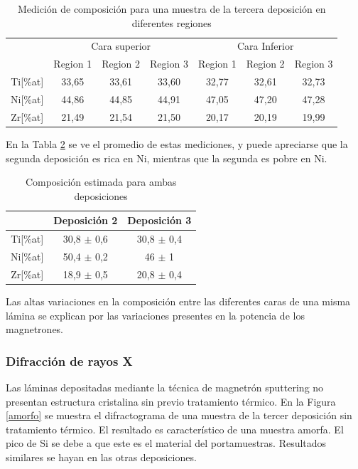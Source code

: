 \documentclass{article}
\theoremstyle{definition}
\theoremstyle{remark}
\begin{document}
\begin{table}[H]
\begin{tabular}{c|c|c|c|c|c|c|}
\cline{2-7}
\multicolumn{1}{l|}{} & \multicolumn{3}{c|}{Cara superior} & \multicolumn{3}{c|}{Cara Inferior} \\ \cline{2-7} 
\multicolumn{1}{l|}{} & Region 1 & Region 2 & Region 3 & Region 1 & Region 2 & Region 3 \\ \hline
\multicolumn{1}{|c|}{Ti{[}\%at{]}} & 33,65 & 33,61 & 33,60 & 32,77 & 32,61 & 32,73 \\ \hline
\multicolumn{1}{|c|}{Ni{[}\%at{]}} & 44,86 & 44,85 & 44,91 & 47,05 & 47,20 & 47,28 \\ \hline
\multicolumn{1}{|c|}{Zr{[}\%at{]}} & 21,49 & 21,54 & 21,50 & 20,17 & 20,19 & 19,99 \\ \hline
\end{tabular}
\caption{Medición de composición para una muestra de la tercera deposición en diferentes regiones}
\label{composition3}
\end{table}

En la Tabla \ref{compositionAvg} se ve el promedio de estas mediciones, y puede apreciarse que la segunda deposición es rica en Ni, mientras que la segunda es pobre en Ni.


\begin{table}[H]
\centering
\begin{tabular}{c|c|c|}
\cline{2-3}
\multicolumn{1}{l|}{} & Deposición 2 & Deposición 3 \\ \hline
\multicolumn{1}{|c|}{Ti{[}\%at{]}} & 30,8 $\pm$ 0,6 & 30,8 $\pm$ 0,4 \\ \hline
\multicolumn{1}{|c|}{Ni{[}\%at{]}} & 50,4 $\pm$ 0,2 & 46 $\pm$ 1 \\ \hline
\multicolumn{1}{|c|}{Zr{[}\%at{]}} & 18,9 $\pm$ 0,5 & 20,8 $\pm$ 0,4 \\ \hline
\end{tabular}
\caption{Composición estimada para ambas deposiciones}
\label{compositionAvg}
\end{table}

Las altas variaciones en la composición entre las diferentes caras de una misma lámina se explican por las variaciones presentes en la potencia de los magnetrones. 

\subsubsection{Difracción de rayos X}
Las láminas depositadas mediante la técnica de magnetrón sputtering no presentan estructura cristalina sin previo tratamiento térmico. En la Figura \ref{amorfo} se muestra el difractograma de una muestra de la tercer deposición sin tratamiento térmico. El resultado es característico de una muestra amorfa. El pico de Si se debe a que este es el material del portamuestras. Resultados similares se hayan en las otras deposiciones.
\end{document}
